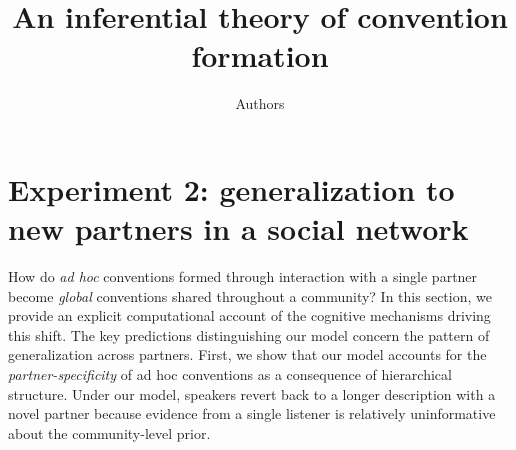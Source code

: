 \documentclass[11pt, floatsintext]{apa6}
\title{An inferential theory of convention formation}
\author{Authors}
\affiliation{Universities}
\begin{document}
\maketitle

%
%
%
%
%
%
%
%
%
%
%
%
%
\section{Experiment 2: generalization to new partners in a social network}

How do \emph{ad hoc} conventions formed through interaction with a single partner become \emph{global} conventions shared throughout a community?
In this section, we provide an explicit computational account of the cognitive mechanisms driving this shift.
The key predictions distinguishing our model concern the pattern of generalization across partners.
First, we show that our model accounts for the \emph{partner-specificity} of ad hoc conventions as a consequence of hierarchical structure. 
Under our model, speakers revert back to a longer description with a novel partner because evidence from a single listener is relatively uninformative about the community-level prior.
\end{document}
